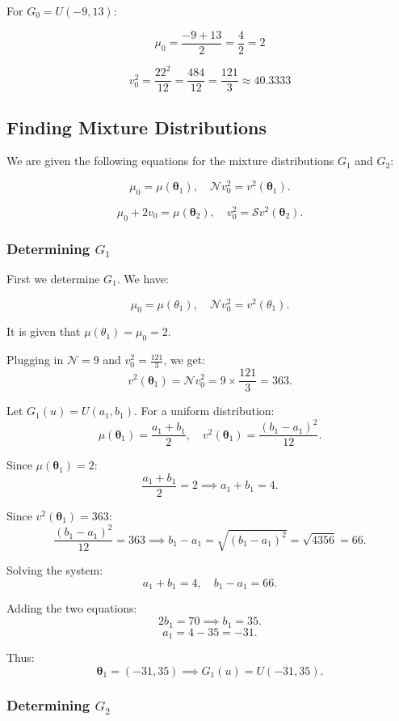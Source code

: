 \documentclass{article}
\begin{document}
For \(G_0 = U(-9, 13)\):

\[
\mu_0 = \frac{-9 + 13}{2} = \frac{4}{2} = 2
\]

\[
v_0^2 = \frac{22^2}{12} = \frac{484}{12} = \frac{121}{3} \approx 40.3333
\]

\subsection{Finding Mixture Distributions}

We are given the following equations for the mixture distributions \(G_1\) and \(G_2\):

\[
\mu_0 = \mu(\boldsymbol\theta_1), \quad \mathcal{N} v_0^2 = v^2(\boldsymbol\theta_1).
\]

\[
\mu_0 + 2v_0 = \mu(\boldsymbol\theta_2), \quad v_0^2 = \mathcal{S} v^2(\boldsymbol\theta_2).
\]

\subsubsection{Determining \(G_1\)}

First we determine \(G_1\). We have:

\[
\mu_0 = \mu(\theta_1), \quad \mathcal{N} v_0^2 = v^2(\theta_1).
\]

It is given that $\mu(\theta_1) = \mu_0 = 2$.

Plugging in \(\mathcal{N} = 9\) and \(v_0^2 = \frac{121}{3} \), we get:
\[
v^2(\boldsymbol\theta_1) = \mathcal{N} v_0^2 = 9 \times \frac{121}{3} = 363.
\]

Let \(G_1(u) = U(a_1, b_1)\). For a uniform distribution:
\[
\mu(\boldsymbol\theta_1) = \frac{a_1 + b_1}{2}, \quad v^2(\boldsymbol\theta_1) = \frac{(b_1 - a_1)^2}{12}.
\]

Since \(\mu(\boldsymbol\theta_1) = 2\):
\[
\frac{a_1 + b_1}{2} = 2 \implies a_1 + b_1 = 4.
\]

Since \(v^2(\boldsymbol\theta_1) = 363\):
\[
\frac{(b_1 - a_1)^2}{12} = 363 \implies b_1 - a_1 = \sqrt{(b_1 - a_1)^2} = \sqrt{4356} = 66.
\]

Solving the system:
\[
a_1 + b_1 = 4, \quad b_1 - a_1 = 66.
\]

Adding the two equations:
\[
2b_1 = 70 \implies b_1 = 35.
\]
\[
a_1 = 4 - 35 = -31.
\]

Thus:
\[
\boldsymbol\theta_1 = (-31, 35) \implies G_1(u) = U(-31, 35).
\]

\subsubsection{Determining \(G_2\)}
\end{document}
